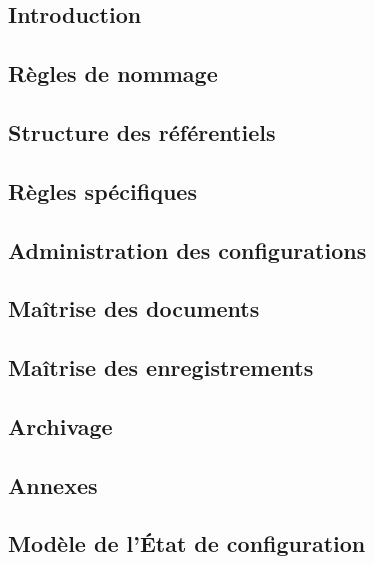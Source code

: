 \documentclass[asi]{picINSA}
\begin{document}
 \couverture{}
 \informationsGenerales{}
  
 \tableofcontents
 
 \chapter*{Introduction}
 
 
 \chapter{Règles de nommage}
 \label{chap regle nommage}
 

 \chapter{Structure des référentiels}
 \label{chap struc ref}
  

 \chapter{Règles spécifiques}
 \label{chap regles specifiques}
  

 \chapter{Administration des configurations}
  

 \chapter{Maîtrise des documents}
  

\chapter{Maîtrise des enregistrements}
 

 \chapter{Archivage}
  \label{archivages}
  


 \begin{appendix}
	\part*{Annexes}
	\chapter{Modèle de l'État de configuration}
	
	
	\listoffigures
	 
	\listoftables
 \end{appendix}

\newpage

\pageQuatriemeCouverture{}
\end{document}
